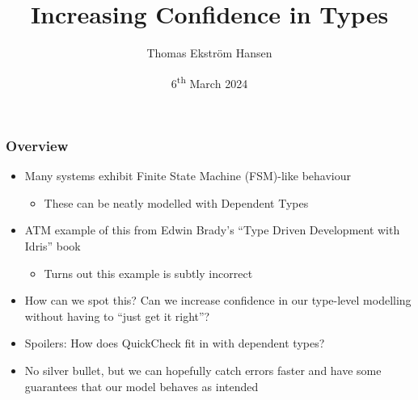\documentclass[compress,handout]{beamer}
\title{Increasing Confidence in Types}
\author{Thomas Ekstr{\" o}m Hansen}
\date{6\textsuperscript{th} March 2024}
\begin{document}
\maketitle


\begin{frame}
  \frametitle{Overview}

  \begin{itemize}
    \item<1-> Many systems exhibit Finite State Machine (FSM)-like behaviour
    \begin{itemize}
      \item<1-> These can be neatly modelled with Dependent Types
    \end{itemize}
    \item<2-> ATM example of this from Edwin Brady's ``Type Driven
              Development with Idris'' book
    \begin{itemize}
      \item<2-> Turns out this example is subtly incorrect
    \end{itemize}
    \item<3-> How can we spot this? Can we increase confidence in our type-level
              modelling without having to ``just get it right''?
    \item<4-> Spoilers: How does QuickCheck fit in with dependent types?
    \item<5-> No silver bullet, but we can hopefully catch errors faster and
              have some guarantees that our model behaves as intended
  \end{itemize}

\end{frame}
\end{document}
